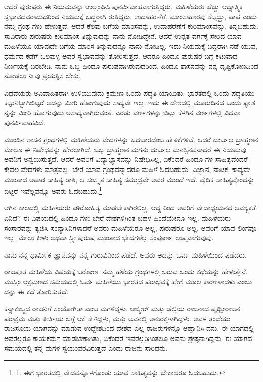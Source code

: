 ಆದರೆ ಪುರುಷರು ಈ ನಿಯಮವನ್ನು ಉಲ್ಲಂಘಿಸಿ ಪುನರ್ವಿವಾಹವಾಗುತ್ತಿದ್ದರು. ಮಹಿಳೆಯರು ಹೆಚ್ಚು ಆಧ್ಯಾತ್ಮಿಕ ಸ್ವಭಾವದವರಾದುದರಿಂದ ನಿಯಮಕ್ಕೆ ಬದ್ಧರಾಗಿ ರುತ್ತಿದ್ದರು. ಉದಾಹರಣೆಗೆ, ಮಾಂಸಾಹಾರವು ಕೆಟ್ಟದ್ದು, ಪಾಪ ಎಂದು ನಮ್ಮ ಗ್ರಂಥ ಗಳು ಹೇಳುತ್ತವೆ. ಆದರೆ ಕೆಲವು ಬಗೆಯ ಮಾಂಸವನ್ನು, ಉದಾಹರಣೆಗೆ ಕುರಿಮಾಂಸವನ್ನು, ತಿನ್ನಬಹುದು. ಸಾವಿರಾರು ಪುರುಷರು ಕುರಿಮಾಂಸ ತಿನ್ನುವುದನ್ನು ನಾನು ನೋಡಿದ್ದೇನೆ. ಆದರೆ ಉನ್ನತ ವರ್ಗಕ್ಕೆ ಸೇರಿದ ಯಾವ ಮಹಿಳೆಯೂ ಯಾವುದೇ ಬಗೆಯ ಮಾಂಸ ತಿನ್ನುವುದನ್ನೂ ನಾನು ನೋಡಿಲ್ಲ. ಇದು ನಿಯಮಕ್ಕೆ ಬದ್ಧರಾಗಿ ನಡೆ ಯುವ, ಧರ್ಮದ ಕಡೆಗೆ ಒಲವುಳ್ಳ ಅವರ ಸ್ವಭಾವವನ್ನು ತೋರಿಸುತ್ತದೆ. ಆದರೂ ಹಿಂದೂ ಪುರುಷರ ಬಗ್ಗೆ ಕಟುವಾದ ನಿರ್ಣಯಕ್ಕೆ ಬರಬೇಡಿ. ನಾನು ಒಬ್ಬ ಹಿಂದೂ ಪುರುಷನಾಗಿರುವುದರಿಂದ, ಹಿಂದೂ ಶಾಸನವನ್ನು ನನ್ನ ದೃಷ್ಟಿಕೋಣದಿಂದ ನೋಡಲು ನೀವು ಪ್ರಯತ್ನಿಸ ಬೇಕು.

ವಿಧವೆಯರು ಅವಿವಾಹಿತರಾಗಿ ಉಳಿಯುವುದು ಕ್ರಮೇಣ ಒಂದು ಪದ್ಧತಿ ಯಾಯಿತು. ಭಾರತದಲ್ಲಿ ಒಂದು ಪದ್ಧತಿಯು ಕಟ್ಟುನಿಟ್ಟಾಗಿಬಿಟ್ಟರೆ ಅದನ್ನು ಮೀರಿ ಹೋಗುವುದು ಸಾಧ್ಯವೇ ಇಲ್ಲ. ಇದು ಈ ದೇಶದಲ್ಲಿ ಮೂರುದಿನದ ಒಂದು ಫ್ಯಾಶ ನ್ನನ್ನು ಮೀರಿ ಹೋಗುವುದು ಅಸಾಧ್ಯವಾಗಿರುವಂತೆ. ಎರಡು ವರ್ಣಗಳನ್ನು ಬಿಟ್ಟು ಕೆಳಗಿನ ವರ್ಣಗಳಲ್ಲಿ ವಿಧವಾ ಪುನರ್ವಿವಾಹವಿದೆ.

ಮುಂದಿನ ಶಾಸನ ಗ್ರಂಥಗಳಲ್ಲಿ ಮಹಿಳೆಯರು ವೇದಗಳನ್ನು ಓದಬಾರದೆಂಬ ಹೇಳಿಕೆಗಳಿವೆ. ಆದರೆ ದುರ್ಬಲ ಬ್ರಾಹ್ಮಣನ ಮೇಲೂ ಈ ನಿಷೇಧವನ್ನು ಹೇರಲಾಗಿದೆ. ಒಬ್ಬ ಬ್ರಾಹ್ಮಣನ ಮಗನು ದುರ್ಬಲ ಮನಸ್ಸಿನವನಾದರೆ ಈ ನಿಯಮವು ಅವನಿಗೆ ಅನ್ವಯಿಸುತ್ತದೆ. ಆದರೆ ಅವರಿಗೆ ವಿದ್ಯಾಭ್ಯಾಸವನ್ನು ನಿಷೇಧಿಸಿಲ್ಲ, ಏಕೆಂದರೆ ಹಿಂದೂ ಗಳ ಸಾಹಿತ್ಯವೆಂದರೆ ಕೇವಲ ವೇದಗಳು ಮಾತ್ರವಲ್ಲ. ಬೇರೆ ಯಾವ ಗ್ರಂಥವನ್ನಾದರೂ ಮಹಿಳೆ ಓದಬಹುದು. ವಿಜ್ಞಾನ, ನಾಟಕ, ಕಾವ್ಯವೇ ಮುಂತಾದ ಅಪಾರ ಸಾಹಿತ್ಯ ರಾಶಿ, ಆ ಸಂಸ್ಕೃತ ಸಾಹಿತ್ಯ ಸಮುದ್ರವೇ ಅವರ ಮುಂದೆ ಇದೆ. ವೈದಿಕ ಸಾಹಿತ್ಯವೊಂದನ್ನು ಬಿಟ್ಟರೆ ಇವೆಲ್ಲವನ್ನೂ ಅವರು ಓದಬಹುದು.\footnote{1. ಈಗ ಭಾರತದಲ್ಲಿ ವೇದವನ್ನೊಳಗೊಂಡು ಯಾವ ಸಾಹಿತ್ಯವನ್ನು ಬೇಕಾದರೂ ಓದಬಹುದು.}

ಆಗಿನ ಕಾಲದಲ್ಲಿ ಮಹಿಳೆಯರು ಪೌರೋಹಿತ್ಯ ಮಾಡಬೇಕಾಗಿರಲಿಲ್ಲ. ಆದ್ದ ರಿಂದ ಅವರಿಗೆ ವೇದಾಧ್ಯಯನದ ಆವಶ್ಯಕತೆ ಏನಿದೆ? ಈ ವಿಷಯದಲ್ಲಿ ಹಿಂದೂ ಗಳು ಬೇರೆ ದೇಶಗಳಿಗಿಂತ ಬಹಳ ಹಿಂದೆಯೇನೂ ಇಲ್ಲ. ಮಹಿಳೆಯರು ಸಂಸಾರವನ್ನು ತ್ಯಜಿಸಿ ಸಂನ್ಯಾಸಿನಿಗಳಾದರೆ ಅವರು ಮಹಿಳೆಯರೂ ಅಲ್ಲ, ಪುರುಷರೂ ಅಲ್ಲ. ಅವರಿಗೆ ಯಾವ ಲಿಂಗವೂ ಇಲ್ಲ. ಮೇಲು ಕೀಳು ಅಥವಾ ಸ್ತ್ರೀ ಪುರುಷ ಮುಂತಾದ ಭೇದಗಳೆಲ್ಲ ಸಂಪೂರ್ಣ ಲುಪ್ತವಾಗುವುವು.

ನಾನು ನನ್ನ ಧಾರ್ಮಿಕ ಜ್ಞಾನವನ್ನು ನನ್ನ ಗುರುವಿನಿಂದ ಪಡೆದೆ, ಅವರು ಅದನ್ನು ಓರ್ವ ಮಹಿಳೆಯಿಂದ ಪಡೆದರು.

ರಾಜಪೂತ ಮಹಿಳೆಯ ವಿಷಯಕ್ಕೆ ಬರೋಣ. ನಮ್ಮ ಹಳೆಯ ಗ್ರಂಥಗಳಲ್ಲಿ ಬರುವ ಒಂದು ಕಥೆಯನ್ನು ಹೇಳುತ್ತೇನೆ. ಮುಸ್ಲಿಂ ಆಕ್ರಮಣದ ಸಮಯದಲ್ಲಿ ಓರ್ವ ಮಹಿಳೆಯು ಭಾರತದ ಪರಾಭವಕ್ಕೆ ಹೇಗೆ ಮೂಲ ಕಾರಣಳಾದಳು ಎಂಬು ದನ್ನು ಈ ಕಥೆ ತೋರಿಸುತ್ತದೆ.

ಕನ್ಯಾಕುಬ್ಜದ ರಾಜನಿಗೆ ಸಂಯೋಗಿತಾ ಎಂಬ ಮಗಳಿದ್ದಳು. ಅಜ್ಮೀರ್ ಮತ್ತು ಡೆಲ್ಲಿಯ ರಾಜನಾದ ಪೃಥ್ವೀರಾಜನ ಪರಾಕ್ರಮ ಮತ್ತು ಕೀರ್ತಿಯ ಬಗ್ಗೆ ಆಕೆ ಕೇಳಿದ್ದಳು, ಮತ್ತು ಅವನಲ್ಲಿ ಅನುರಕ್ತಳಾಗಿದ್ದಳು. ಅವಳ ತಂದೆಯು ರಾಜಸೂಯ ಯಾಗವನ್ನು ಮಾಡುವ ಉದ್ದೇಶದಿಂದ ದೇಶದ ಎಲ್ಲ ರಾಜರುಗಳನ್ನೂ ಆಹ್ವಾನಿಸಿ ದನು. ಈ ಯಾಗದಲ್ಲಿ ಅವರೆಲ್ಲರೂ ಕಾಯಕರ್ಮ ಮಾಡಬೇಕಾಗಿತ್ತು, ಏಕೆಂದರೆ ಇವರೆಲ್ಲರಿಗಿಂತಲೂ ಅವನು ಶ್ರೇಷ್ಠನಾಗಿದ್ದನು. ಈ ಯಾಗದ ಸಮಯದಲ್ಲಿ ತನ್ನ ಮಗಳ ಸ್ವಯಂವರವಿರುತ್ತದೆ ಎಂದು ರಾಜನು ಸಾರಿದನು.

